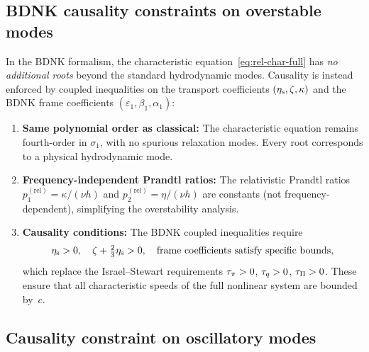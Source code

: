 \subsection{BDNK causality constraints on overstable modes}
\label{subsec:rel-46-BDNK-causality}

In the BDNK formalism, the characteristic equation~\eqref{eq:rel-char-full}
has \emph{no additional roots} beyond the standard hydrodynamic modes.
Causality is instead enforced by coupled inequalities on the transport
coefficients $(\eta_{\mathrm{s}}, \zeta, \kappa)$ and the BDNK frame
coefficients $(\varepsilon_1, \beta_1, \alpha_1)$:

\begin{enumerate}
  \item \textbf{Same polynomial order as classical:} The characteristic
    equation remains fourth-order in $\sigma_{1}$, with no spurious
    relaxation modes.  Every root corresponds to a physical hydrodynamic
    mode.

  \item \textbf{Frequency-independent Prandtl ratios:} The relativistic
    Prandtl ratios $p_{1}^{(\mathrm{rel})} = \kappa/(\nu h)$ and
    $p_{2}^{(\mathrm{rel})} = \eta/(\nu h)$ are constants (not
    frequency-dependent), simplifying the overstability analysis.

  \item \textbf{Causality conditions:} The BDNK coupled inequalities
    \citep{BemficaDNK2023} require
    \begin{equation}
      \eta_{\mathrm{s}} > 0, \quad
      \zeta + \tfrac{2}{3}\eta_{\mathrm{s}} > 0, \quad
      \text{frame coefficients satisfy specific bounds},
      \label{eq:rel-BDNK-causality-conditions}
    \end{equation}
    which replace the Israel--Stewart requirements $\tau_{\pi}>0$, $\tau_{q}>0$,
    $\tau_{\Pi}>0$.  These ensure that all characteristic speeds of the
    full nonlinear system are bounded by~$c$.
\end{enumerate}

\subsection{Causality constraint on oscillatory modes}
\label{subsec:rel-46-causality}

